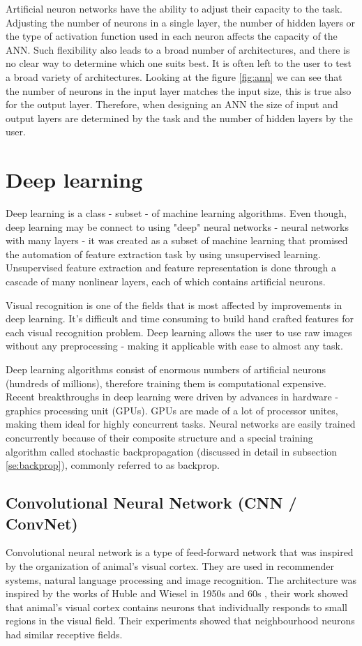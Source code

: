 \documentclass[times, utf8, diplomski]{fer}
\begin{document}
Artificial neuron networks have the ability to adjust their capacity to the task. Adjusting the number of neurons in a single layer, the number of hidden layers or the type of activation function used in each neuron affects the capacity of the ANN. Such flexibility also leads to a broad number of architectures, and there is no clear way to determine which one suits best. It is often left to the user to test a broad variety of architectures. Looking at the figure \ref{fig:ann} we can see that the number of neurons in the input layer matches the input size, this is true also for the output layer. Therefore, when designing an ANN the size of input and output layers are determined by the task and the number of hidden layers by the user.


\section{Deep learning}
Deep learning is a class - subset - of machine learning algorithms. Even though, deep learning may be connect to using "deep" neural networks - neural networks with many layers - it was created as a subset of machine learning that promised the automation of feature extraction task by using unsupervised learning. Unsupervised feature extraction and feature representation is done through a cascade of many nonlinear layers, each of which contains artificial neurons. 

Visual recognition is one of the fields that is most affected by improvements in deep learning. It's difficult and time consuming to build hand crafted features for each visual recognition problem. Deep learning allows the user to use raw images without any preprocessing - making it applicable with ease to almost any task.

Deep learning algorithms consist of enormous numbers of  artificial neurons (hundreds of millions), therefore training them is computational expensive. Recent breakthroughs in deep learning were driven by advances in hardware - graphics processing unit (GPUs). GPUs are made of a lot of processor unites, making them ideal for highly concurrent tasks. Neural networks are easily trained concurrently because of their composite structure and a special training algorithm called stochastic backpropagation (discussed in detail in subsection \ref{se:backprop}), commonly referred to as backprop.

\subsection{Convolutional Neural Network (CNN /  ConvNet)}
Convolutional neural network is a type of feed-forward network that was inspired by the organization of animal's visual cortex. They are used in recommender systems, natural language processing and image recognition. The architecture was inspired by the works of Huble and Wiesel in 1950s and 60s \citep{hubel_receptive_1968}, their work showed that animal's visual cortex contains neurons that individually responds to small regions in the visual field. Their experiments showed that neighbourhood neurons had similar receptive fields.
\end{document}

